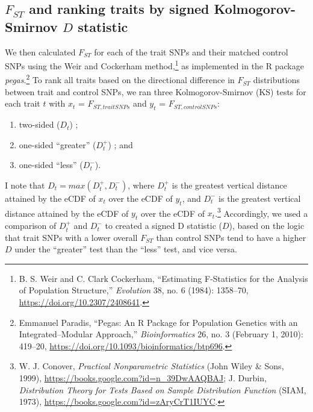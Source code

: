 \documentclass[
  9pt,
]{book}
\begin{document}
\hypertarget{f_st-and-ranking-traits-by-signed-kolmogorov-smirnov-d-statistic}{%
\subsection{\texorpdfstring{\(F_{ST}\) and ranking traits by signed Kolmogorov-Smirnov \(D\) statistic}{F\_\{ST\} and ranking traits by signed Kolmogorov-Smirnov D statistic}}\label{f_st-and-ranking-traits-by-signed-kolmogorov-smirnov-d-statistic}}

We then calculated \(F_{ST}\) for each of the trait SNPs and their matched control SNPs using the Weir and Cockerham method,\footnote{B. S. Weir and C. Clark Cockerham, {``Estimating {F-Statistics} for the {Analysis} of {Population Structure},''} \emph{Evolution} 38, no. 6 (1984): 1358--70, \url{https://doi.org/10.2307/2408641}.} as implemented in the R package \emph{pegas}.\footnote{Emmanuel Paradis, {``Pegas: An {R} Package for Population Genetics with an Integrated--Modular Approach,''} \emph{Bioinformatics} 26, no. 3 (February 1, 2010): 419--20, \url{https://doi.org/10.1093/bioinformatics/btp696}.} To rank all traits based on the directional difference in \(F_{ST}\) distributions between trait and control SNPs, we ran three Kolmogorov-Smirnov (KS) tests for each trait \(t\) with \(x_t\) = \(F_{ST, trait SNPs}\) and \(y_t\) = \(F_{ST, control SNPs}\):

\begin{enumerate}
\def\labelenumi{\arabic{enumi}.}
\item
  two-sided (\(D_t\)) ;
\item
  one-sided ``greater'' (\(D_t^+\)) ; and
\item
  one-sided ``less'' (\(D_t^-\)).
\end{enumerate}

I note that \(D_{t} = max(D_t^+, D_t^-)\), where \(D_t^+\) is the greatest vertical distance attained by the eCDF of \(x_t\) over the eCDF of \(y_t\), and \(D_t^-\) is the greatest vertical distance attained by the eCDF of \(y_t\) over the eCDF of \(x_t\).\footnote{W. J. Conover, \emph{Practical {Nonparametric Statistics}} ({John Wiley \& Sons}, 1999), \url{https://books.google.com?id=n_39DwAAQBAJ}; J. Durbin, \emph{Distribution {Theory} for {Tests Based} on {Sample Distribution Function}} ({SIAM}, 1973), \url{https://books.google.com?id=zAryCrT1IUYC}.} Accordingly, we used a comparison of \(D_t^+\) and \(D_t^-\) to created a signed D statistic (\(D\)), based on the logic that trait SNPs with a lower overall \(F_{ST}\) than control SNPs tend to have a higher \(D\) under the ``greater'' test than the ``less'' test, and vice versa.
\end{document}
